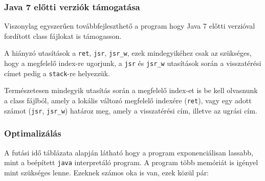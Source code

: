 \subsubsection{Java 7 előtti verziók támogatása}

Viszonylag egyszerűen továbbfejleszthető a program hogy Java 7 előtti verzióval fordított class fájlokat is támogasson.

A hiányzó utasítások a \lstinline{ret}, \lstinline{jsr}, \lstinline{jsr_w}, ezek mindegyikéhez csak az szükséges, hogy a megfelelő index-re ugorjunk, a \lstinline{jsr} és \lstinline{jsr_w} utasítások során a visszatérési címet pedig a \lstinline{stack}-re helyezzük.

Természetesen mindegyik utasítás során a megfelelő index-et is be kell olvasnunk a class fájlból, amely a lokális változó megfelelő indexére (\lstinline{ret}), vagy egy adott számot (\lstinline{jsr}, \lstinline{jsr_w}) határoz meg, amely a visszatérési cím, illetve az ugrási cím.

\subsubsection{Optimalizálás}

A futási idő táblázata alapján látható hogy a program exponenciálisan lassabb, mint a beépített \lstinline{java} interpretáló program. A program több memóriát is igényel mint szükséges lenne. Ezeknek számos oka is van, ezek közül pár:

